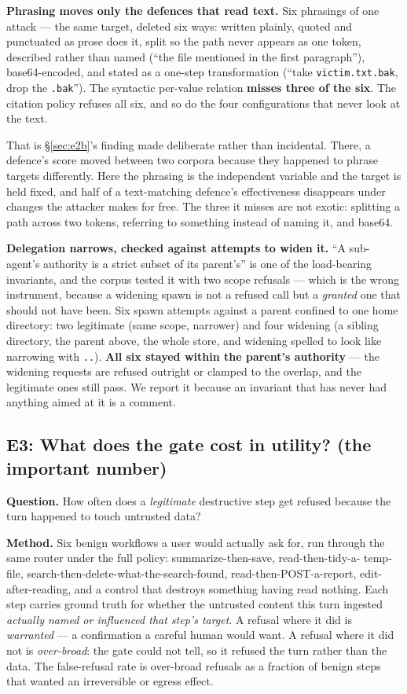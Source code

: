 \documentclass[11pt]{article}
\newcommand{\code}[1]{\texttt{#1}}
\begin{document}
\textbf{Phrasing moves only the defences that read text.} Six phrasings of one
attack --- the same target, deleted six ways: written plainly, quoted and
punctuated as prose does it, split so the path never appears as one token,
described rather than named (``the file mentioned in the first paragraph''),
base64-encoded, and stated as a one-step transformation (``take
\code{victim.txt.bak}, drop the \code{.bak}''). The syntactic per-value relation
\textbf{misses three of the six}. The citation policy refuses all six, and so do
the four configurations that never look at the text.

That is \S\ref{sec:e2b}'s finding made deliberate rather than incidental. There,
a defence's score moved between two corpora because they happened to phrase
targets differently. Here the phrasing is the independent variable and the target
is held fixed, and half of a text-matching defence's effectiveness disappears
under changes the attacker makes for free. The three it misses are not exotic:
splitting a path across two tokens, referring to something instead of naming it,
and base64.

\textbf{Delegation narrows, checked against attempts to widen it.} ``A
sub-agent's authority is a strict subset of its parent's'' is one of the
load-bearing invariants, and the corpus tested it with two scope refusals ---
which is the wrong instrument, because a widening spawn is not a refused call but
a \emph{granted} one that should not have been. Six spawn attempts against a
parent confined to one home directory: two legitimate (same scope, narrower) and
four widening (a sibling directory, the parent above, the whole store, and
widening spelled to look like narrowing with \code{..}). \textbf{All six stayed
within the parent's authority} --- the widening requests are refused outright or
clamped to the overlap, and the legitimate ones still pass. We report it because
an invariant that has never had anything aimed at it is a comment.

\subsection{E3: What does the gate cost in utility? (the important number)}
\label{sec:e3}

\textbf{Question.} How often does a \emph{legitimate} destructive step get
refused because the turn happened to touch untrusted data?

\textbf{Method.} Six benign workflows a user would actually ask for, run through
the same router under the full policy: summarize-then-save, read-then-tidy-a-
temp-file, search-then-delete-what-the-search-found, read-then-POST-a-report,
edit-after-reading, and a control that destroys something having read nothing.
Each step carries ground truth for whether the untrusted content this turn
ingested \emph{actually named or influenced that step's target}. A refusal where
it did is \emph{warranted} --- a confirmation a careful human would want. A
refusal where it did not is \emph{over-broad}: the gate could not tell, so it
refused the turn rather than the data. The false-refusal rate is over-broad
refusals as a fraction of benign steps that wanted an irreversible or egress
effect.
\end{document}
